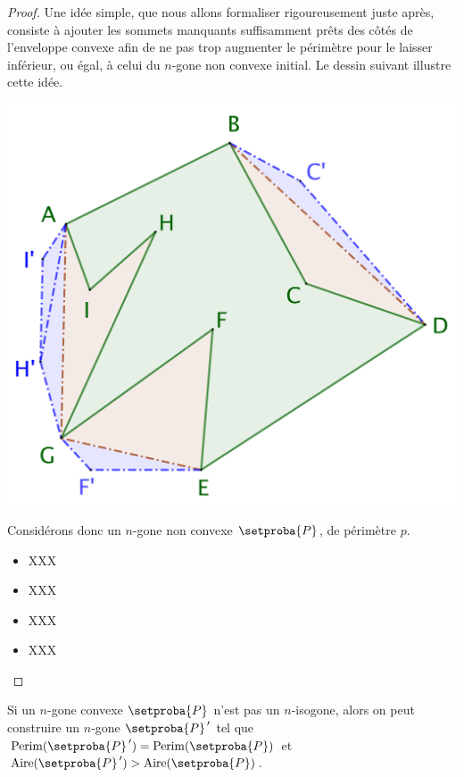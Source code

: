\begin{proof}
	Une idée simple, que nous allons formaliser rigoureusement juste après, consiste à ajouter les sommets manquants suffisamment prêts des côtés de l'enveloppe convexe afin de ne pas trop augmenter le périmètre pour le laisser inférieur, ou égal, à celui du $n$-gone non convexe initial. Le dessin suivant illustre cette idée.	
	
	\begin{center}
		\includegraphics[scale=.4]{content/polygon/polygon-convex-hull-distortion.png}
	\end{center}

	Considérons donc un $n$-gone non convexe $\setproba{P}$, de périmètre $p$.
	\begin{itemize}
		\item XXX

		\item XXX

		\item XXX

		\item XXX
	\end{itemize}
\end{proof}




\begin{fact} \label{iso-poly}
	Si un $n$-gone convexe $\setproba{P}$ n'est pas un $n$-isogone, alors on peut construire un $n$-gone $\setproba{P}^{\,\prime}$ tel que 
	$\perim{\setproba{P}^{\,\prime}} = \perim{\setproba{P}}$ 
	et 
	$\area{\setproba{P}^{\,\prime}} > \area{\setproba{P}}$.
\end{fact}


